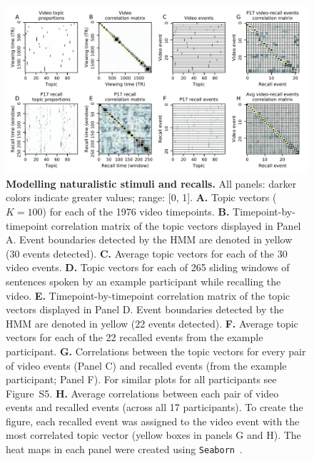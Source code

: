 \documentclass{article}
\newcommand{\matchmats}{S5}
\begin{document}
\begin{figure}[tp]
\centering
\includegraphics[width=\textwidth]{figs/eventseg}
\caption{\small \textbf{Modelling naturalistic stimuli and recalls.} All panels: darker colors indicate greater values; range: [0, 1].  \textbf{A.} Topic vectors ($K = 100$) for each of the 1976 video timepoints.  \textbf{B.} Timepoint-by-timepoint correlation matrix of the topic vectors displayed in Panel A.  Event boundaries detected by the HMM are denoted in yellow (30 events detected).  \textbf{C.} Average topic vectors for each of the 30 video events. \textbf{D.} Topic vectors for each of 265 sliding windows of sentences spoken by an example participant while recalling the video.  \textbf{E.} Timepoint-by-timepoint correlation matrix of the topic vectors displayed in Panel D. Event boundaries detected by the HMM are denoted in yellow (22 events detected).  \textbf{F.} Average topic vectors for each of the 22 recalled events from the example participant.  \textbf{G.} Correlations between the topic vectors for every pair of video events (Panel C) and recalled events (from the example participant; Panel F).  For similar plots for all participants see Figure~\matchmats.  \textbf{H.} Average correlations between each pair of video events and recalled events (across all 17 participants).  To create the figure, each recalled event was assigned to the video event with the most correlated topic vector (yellow boxes in panels G and H).  The heat maps in each panel were created using \texttt{Seaborn}~\citep{WaskEtal16}.}
\label{fig:model}
\end{figure}
\end{document}
